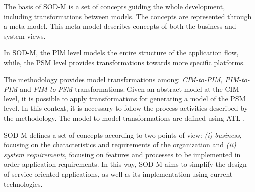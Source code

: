 The basis of SOD-M is a set of concepts guiding the whole
development, including transformations between models. The concepts are
represented through a meta-model. This meta-model describes concepts of both the
business and system views.
 

In SOD-M, the PIM level models the entire structure of the application flow,
while, the PSM level provides transformations towards more specific platforms.

The methodology provides model transformations among:
\textit{CIM-to-PIM, PIM-to-PIM} and \textit{PIM-to-PSM} transformations. Given
an abstract model at the CIM level, it is possible to apply transformations for
generating a model of the PSM level. In this context, it is necessary to
follow the process activities described by the methodology. The model to model
transformations are defined using ATL \cite{atl_manual}.

SOD-M defines a set of concepts according to two points of view:
\textit{(i)} \textit{business}, focusing on the characteristics and requirements
of the organization and \textit{(ii)} \textit{system requirements}, focusing on
features and processes to be implemented in order application requirements. In
this way, SOD-M aims to simplify the design of service-oriented applications, as
well as its implementation using current technologies.

% 
% 



